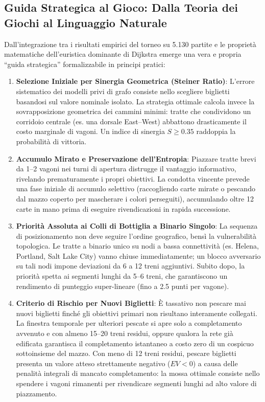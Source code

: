 \documentclass[11pt,a4paper]{article}
\begin{document}
\subsection{Guida Strategica al Gioco: Dalla Teoria dei Giochi al Linguaggio Naturale}
\label{subsec:guida_strategica}
Dall'integrazione tra i risultati empirici del torneo su 5.130 partite e le proprietà matematiche dell'euristica dominante di Dijkstra emerge una vera e propria ``guida strategica'' formalizzabile in principi pratici:
\begin{enumerate}
    \item \textbf{Selezione Iniziale per Sinergia Geometrica (Steiner Ratio)}: L'errore sistematico dei modelli privi di grafo consiste nello scegliere biglietti basandosi sul valore nominale isolato. La strategia ottimale calcola invece la sovrapposizione geometrica dei cammini minimi: tratte che condividono un corridoio centrale (es. una dorsale East--West) abbattono drasticamente il costo marginale di vagoni. Un indice di sinergia $S \ge 0.35$ raddoppia la probabilità di vittoria.
    \item \textbf{Accumulo Mirato e Preservazione dell'Entropia}: Piazzare tratte brevi da 1--2 vagoni nei turni di apertura distrugge il vantaggio informativo, rivelando prematuramente i propri obiettivi. La condotta vincente prevede una fase iniziale di accumulo selettivo (raccogliendo carte mirate o pescando dal mazzo coperto per mascherare i colori perseguiti), accumulando oltre 12 carte in mano prima di eseguire rivendicazioni in rapida successione.
    \item \textbf{Priorità Assoluta ai Colli di Bottiglia a Binario Singolo}: La sequenza di posizionamento non deve seguire l'ordine geografico, bensì la vulnerabilità topologica. Le tratte a binario unico su nodi a bassa connettività (es. Helena, Portland, Salt Lake City) vanno chiuse immediatamente; un blocco avversario su tali nodi impone deviazioni da 6 a 12 treni aggiuntivi. Subito dopo, la priorità spetta ai segmenti lunghi da 5--6 treni, che garantiscono un rendimento di punteggio super-lineare (fino a 2.5 punti per vagone).
    \item \textbf{Criterio di Rischio per Nuovi Biglietti}: È tassativo non pescare mai nuovi biglietti finché gli obiettivi primari non risultano interamente collegati. La finestra temporale per ulteriori pescate si apre solo a completamento avvenuto e con almeno 15--20 treni residui, oppure qualora la rete già edificata garantisca il completamento istantaneo a costo zero di un cospicuo sottoinsieme del mazzo. Con meno di 12 treni residui, pescare biglietti presenta un valore atteso strettamente negativo ($EV < 0$) a causa delle penalità integrali di mancato completamento: la mossa ottimale consiste nello spendere i vagoni rimanenti per rivendicare segmenti lunghi ad alto valore di piazzamento.
\end{enumerate}
\end{document}

